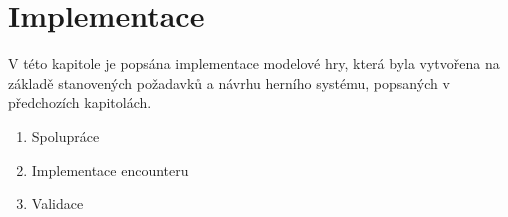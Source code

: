 \chapter{Implementace}
\label{chap:implementation}

V této kapitole je popsána implementace modelové hry, která byla vytvořena na základě stanovených požadavků a návrhu herního systému, popsaných v předchozích kapitolách.

\begin{enumerate}
    \item Spolupráce
    \item Implementace encounteru
    \item Validace
\end{enumerate}